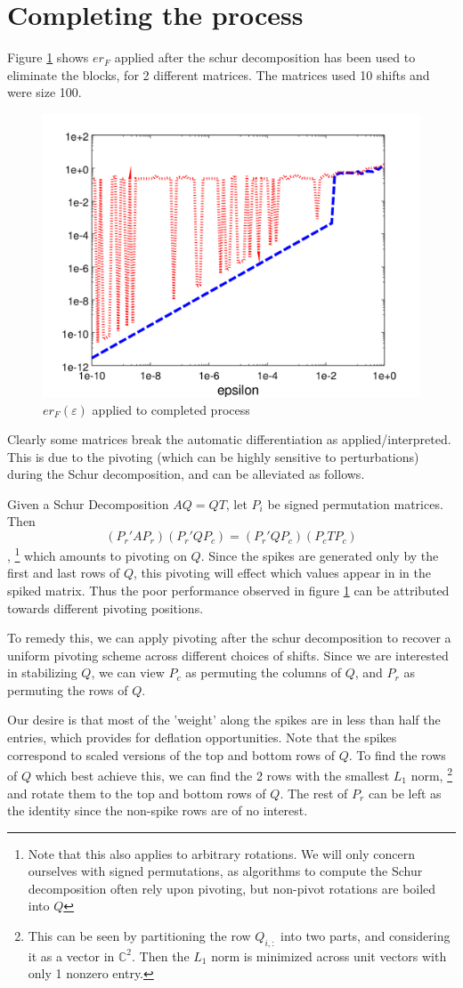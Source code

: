 \documentclass{article}
\newcommand{\e}{\varepsilon}
\begin{document}
\section{Completing the process}

Figure \ref{fig:vanErr} shows $er_F$ applied after the schur decomposition
has been used to eliminate the blocks, for 2 different matrices.
The matrices used 10 shifts and were size 100.

\begin{figure}[h!]
  \centering
  \includegraphics[width=.5\linewidth]{endVanillaError.png}
  \caption{$er_F(\e)$ applied to completed process}\label{fig:vanErr}
\end{figure}

Clearly some matrices break the automatic differentiation as applied/interpreted.
This is due to the pivoting (which can be highly sensitive to perturbations) 
during the Schur decomposition, and can be alleviated as follows.

Given a Schur Decomposition $AQ = QT$, let $P_i$ be signed permutation
matrices.
Then 
\[
  (P_r'AP_r)(P_r'QP_c) = (P_r'QP_c)(P_cTP_c)
\], 
\footnote{Note that this also applies to arbitrary rotations.
We will only concern ourselves with signed permutations, as algorithms to compute
the Schur decomposition often rely upon pivoting, but non-pivot rotations are boiled into $Q$}
which amounts
to pivoting on $Q$.
Since the spikes are generated only by the first and last rows of $Q$,
this pivoting will effect which values appear in in the spiked matrix.
Thus the poor performance observed in figure \ref{fig:vanErr} can be attributed
towards different pivoting positions.

To remedy this, we can apply pivoting after the schur decomposition to
recover a uniform pivoting scheme across different choices of shifts.
Since we are interested in stabilizing $Q$, we can view
$P_c$ as permuting the columns of $Q$, and $P_r$ as permuting the rows of $Q$.

Our desire is that most of the 'weight' along the spikes are in less than half
the entries, which provides for deflation opportunities.
Note that the spikes correspond to scaled versions of the top and bottom rows
of $Q$.
To find the rows of $Q$ which best achieve this, we can find
the 2 rows with the smallest $L_1$ norm,
\footnote{
This can be seen by partitioning the row $Q_{i,:}$ into two parts,
and considering it as a vector in $\mathbb{C}^2$.
Then the $L_1$ norm is minimized across unit vectors with only 1 nonzero entry.}
and rotate them to the top and bottom rows of $Q$.
The rest of $P_r$ can be left as the identity since the non-spike rows are of no interest.
\end{document}
